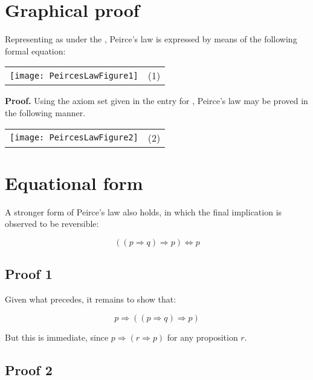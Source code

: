 \documentclass[12pt]{article}
\begin{document}
\section{Graphical proof}

Representing  as  under the , Peirce's law is expressed by means of the following formal equation:

\begin{center}\begin{tabular}{cc}
\texttt{[image: PeircesLawFigure1]} & (1) \\
\end{tabular}\end{center}

\textbf{Proof.}  Using the axiom set given in the entry for , Peirce's law may be proved in the following manner.

\begin{center}\begin{tabular}{cc}
\texttt{[image: PeircesLawFigure2]} & (2) \\
\end{tabular}\end{center}

\section{Equational form}

A stronger form of Peirce's law also holds, in which the final implication is observed to be reversible:

\[ ((p \Rightarrow q) \Rightarrow p) \Leftrightarrow p \]

\subsection{Proof 1}

Given what precedes, it remains to show that:

\[ p \Rightarrow ((p \Rightarrow q) \Rightarrow p) \]

But this is immediate, since $p \Rightarrow (r \Rightarrow p)$ for any proposition $r.$

\subsection{Proof 2}
\end{document}
